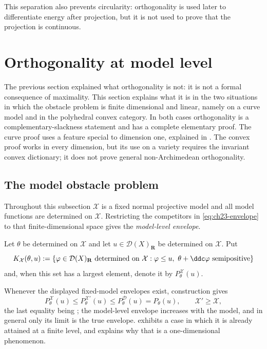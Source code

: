 This separation also prevents circularity: orthogonality is used later to
differentiate energy after projection, but it is not used to prove that the
projection is continuous.

\section{Orthogonality at model level}
\label{sec:ch23-model-orthogonality}

The previous section explained what orthogonality is not: it is not a
formal consequence of maximality.  This section explains what it is in the
two situations in which the obstacle problem is finite dimensional and
linear, namely on a curve model and in the polyhedral convex category.  In
both cases orthogonality is a complementary-slackness statement and has a
complete elementary proof.  The curve proof uses a feature special to
dimension one, explained in .
The convex proof works in every dimension, but its use on a variety
requires the invariant convex dictionary; it does not prove general
non-Archimedean orthogonality.

\subsection{The model obstacle problem}
\label{sec:ch23-model-obstacle-problem}

Throughout this subsection $\mathcal X$ is a fixed normal projective model
and all model functions are determined on $\mathcal X$.  Restricting the
competitors in \eqref{eq:ch23-envelope} to that finite-dimensional space
gives the \emph{model-level envelope}.

\begin{definition}
\label{def:ch23-fixed-model-envelope}
Let $\theta$ be determined on $\mathcal X$ and let
$u\in\mathcal D(X)_{\mathbf R}$ be determined on $\mathcal X$.  Put
\begin{equation}\label{eq:ch23-fixed-model-competitors}
 K_{\mathcal X}(\theta,u)
 :=\{\varphi\in\mathcal D(X)_{\mathbf R}\ \text{determined on }\mathcal X:
     \varphi\leq u,\ \theta+\ddc\varphi\ \text{semipositive}\}
\end{equation}
and, when this set has a largest element, denote it by
$P^{\mathcal X}_\theta(u)$.
\end{definition}

Whenever the displayed fixed-model envelopes exist, construction gives
\begin{equation}\label{eq:ch23-model-level-below}
 P^{\mathcal X}_\theta(u)\leq P^{\mathcal X'}_\theta(u)
 \leq P^{\mathcal D}_\theta(u)=P_\theta(u),
 \qquad \mathcal X'\geq\mathcal X,
\end{equation}
the last equality being
; the model-level envelope
increases with the model, and in general only its limit is the true
envelope.   exhibits a case in which it
is already attained at a finite level, and
 explains why that is a one-dimensional
phenomenon.

